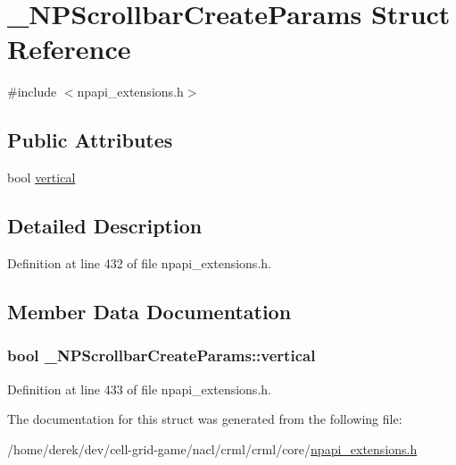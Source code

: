 \hypertarget{struct___n_p_scrollbar_create_params}{
\section{\_\-NPScrollbarCreateParams Struct Reference}
\label{struct___n_p_scrollbar_create_params}
}


{\ttfamily \#include $<$npapi\_\-extensions.h$>$}

\subsection*{Public Attributes}
\begin{DoxyCompactItemize}
\item 
bool \hyperlink{struct___n_p_scrollbar_create_params_a25f2638542841b91b122fc338931d154}{vertical}
\end{DoxyCompactItemize}


\subsection{Detailed Description}


Definition at line 432 of file npapi\_\-extensions.h.



\subsection{Member Data Documentation}
\hypertarget{struct___n_p_scrollbar_create_params_a25f2638542841b91b122fc338931d154}{
\subsubsection[{vertical}]{\setlength{\rightskip}{0pt plus 5cm}bool {\bf \_\-NPScrollbarCreateParams::vertical}}}
\label{struct___n_p_scrollbar_create_params_a25f2638542841b91b122fc338931d154}


Definition at line 433 of file npapi\_\-extensions.h.



The documentation for this struct was generated from the following file:\begin{DoxyCompactItemize}
\item 
/home/derek/dev/cell-\/grid-\/game/nacl/crml/crml/core/\hyperlink{npapi__extensions_8h}{npapi\_\-extensions.h}\end{DoxyCompactItemize}
